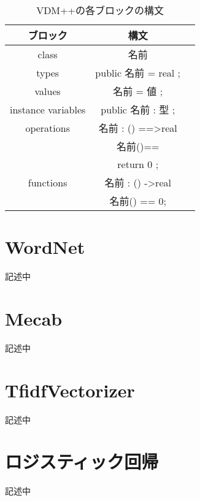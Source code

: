 \begin{table}[t]
    \begin{center}      
        \caption{VDM++の各ブロックの構文}\label{table:vdm_syntax}
        \begin{tabular}{c|c|c}
        ブロック  & 構文　\\ \hline \hline
        class & 名前 \\ \hline
        types	 & public 名前 = real ;\\ \hline
        values  & 名前 = 値 ;\\ \hline
        instance variables & public 名前 : 型 ;\\ \hline
        operations & 名前 : () ==\textgreater real\\
                   & 名前()==\\
                   & return 0 ;\\ \hline 
        functions  & 名前 : () -\textgreater real \\
                   & 名前() == 0; \\ \hline 
        \end{tabular}
    \end{center}
\end{table}

\section{WordNet}
\label{sec:wordNet}
記述中

\section{Mecab}
\label{sec:mecab}
記述中

\section{TfidfVectorizer}
\label{sec:tfidf}
記述中

\section{ロジスティック回帰}
\label{sec:logistic}
記述中